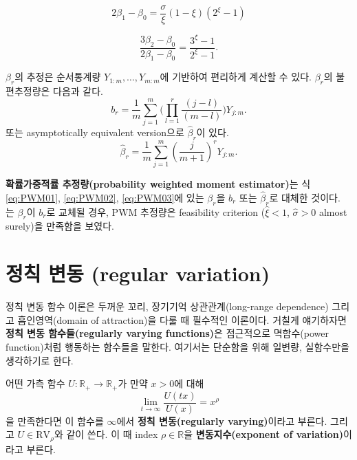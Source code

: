 \documentclass[b5paper,]{scrbook}
\theoremstyle{plain}
\theoremstyle{definition}
\numberwithin{equation}{section}
\let\BeginKnitrBlock\begin \let\EndKnitrBlock\end
\begin{document}
\begin{equation}
2\beta_{1}-\beta_{0}=\frac{\sigma}{\xi}(1-\xi)(2^{\xi}-1)
\label{eq:PWM02}
\end{equation}

\begin{equation}
\frac{3\beta_{2}-\beta_{0}}{2\beta_{1}-\beta_{0}}=\frac{3^{\xi}-1}{2^{\xi}-1}.
\label{eq:PWM03}
\end{equation}

\(\beta_{r}\)의 추정은 순서통계량 \(Y_{1:m},\ldots, Y_{m:m}\)에 기반하여 편리하게 계산할 수 있다. \(\beta_{r}\)의 불편추정량은 다음과 같다.
\[b_{r}=\frac{1}{m}\sum_{j=1}^{m}\Big(\prod_{l=1}^{r}\frac{(j-l)}{(m-l)}\Big)Y_{j:m}.\]
또는 asymptotically equivalent version으로 \(\hat{\beta}_{r}\)이 있다.
\[\hat{\beta}_{r} =\frac{1}{m}\sum_{j=1}^{m}(\frac{j}{m+1})^{r}Y_{j:m}.\]

\textbf{확률가중적률 추정량(probability weighted moment estimator)}는 식 \eqref{eq:PWM01}, \eqref{eq:PWM02}, \eqref{eq:PWM03}에 있는 \(\beta_{r}\)을 \(b_{r}\) 또는 \(\hat{\beta}_{r}\)로 대체한 것이다. \citep{Hosking1985}는 \(\beta_{r}\)이 \(b_{r}\)로 교체될 경우, PWM 추정량은 feasibility criterion (\(\hat{\xi}<1\), \(\hat{\sigma}>0\) almost surely)을 만족함을 보였다.

\hypertarget{--regular-variation}{%
\section{정칙 변동 (regular variation)}\label{--regular-variation}}

정칙 변동 함수 이론은 두꺼운 꼬리, 장기기억 상관관계(long-range dependence) 그리고 흡인영역(domain of attraction)을 다룰 때 필수적인 이론이다. \citep{Resnick2007} 거칠게 얘기하자면 \textbf{정칙 변동 함수들(regularly varying functions)}은 점근적으로 멱함수(power function)처럼 행동하는 함수들을 말한다. 여기서는 단순함을 위해 일변량, 실함수만을 생각하기로 한다.

\BeginKnitrBlock{definition}[정칙 변동 함수]
\protect\hypertarget{def:unnamed-chunk-442}{}{\label{def:unnamed-chunk-442} {} }어떤 가측 함수 \(U: \mathbb{R}_{+}\rightarrow \mathbb{R}_{+}\)가 만약 \(x>0\)에 대해
\[\lim_{t\rightarrow\infty}\frac{U(tx)}{U(x)}=x^{\rho}\]
을 만족한다면 이 함수를 \(\infty\)에서 \textbf{정칙 변동(regularly varying)}이라고 부른다. 그리고 \(U\in \text{RV}_{\rho}\)와 같이 쓴다. 이 때 index \(\rho\in\mathbb{R}\)을 \textbf{변동지수(exponent of variation)}이라고 부른다.
\EndKnitrBlock{definition}
\end{document}
